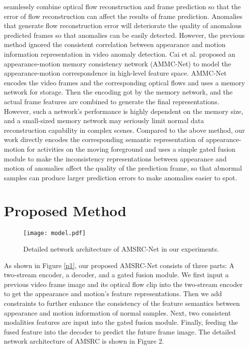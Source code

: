 \documentclass[sigconf]{acmart}
\begin{document}
\cite{liu2021hybrid} seamlessly combine optical flow reconstruction and frame prediction so that the error of flow reconstruction can affect the results of frame prediction. Anomalies that generate flow reconstruction error will deteriorate the quality of anomalous predicted frames so that anomalies can be easily detected. However, the previous method ignored the consistent correlation between appearance and motion information representation in video anomaly detection. Cai et al. \cite{cai2021appearance} proposed an appearance-motion memory consistency network (AMMC-Net) to model the appearance-motion correspondence in high-level feature space. AMMC-Net encodes the video frames and the corresponding optical flows and uses a memory network for storage. Then the encoding got by the memory network, and the actual frame features are combined to generate the final representations. However, such a network’s performance is highly dependent on the memory size, and a small-sized memory network may seriously limit normal data reconstruction capability in complex scenes. Compared to the above method, our work directly encodes the corresponding semantic representation of appearance-motion for activities on the moving foreground and uses a simple gated fusion module to make the inconsistency representations between appearance and motion of anomalies affect the quality of the prediction frame, so that abnormal samples can produce larger prediction errors to make anomalies easier to spot.

\section{Proposed Method}
\begin{figure*}[ht]
	\centering
	\texttt{[image: model.pdf]}
	\caption{Detailed network architecture of AMSRC-Net in our experiments.}
	\label{p2}
\end{figure*}

As shown in Figure \ref{p1}, our proposed AMSRC-Net consists of three parts:  A two-stream encoder, a decoder, and a gated fusion module. We first input a previous video frame image and its optical flow clip into the two-stream encoder to get the appearance and motion’s feature representations. Then we add constraints to further enhance the consistency of the feature semantics between appearance and motion information of normal samples. Next, two consistent modalities features are input into the gated fusion module. Finally, feeding the fused feature into the decoder to predict the future frame image. The detailed network architecture of AMSRC is shown in Figure 2.
\end{document}
